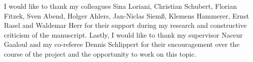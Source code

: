 %
%
I would like to thank my colleagues Sina Loriani, Christian Schubert, Florian Fitzek, Sven Abend, Holger Ahlers, Jan-Niclas Siem{\ss}, Klemens Hammerer, Ernst Rasel and Waldemar Herr for their support during my research and constructive criticism of the manuscript. Lastly, I would like to thank my supervisor Naceur Gaaloul and my co-referee Dennis Schlippert for their encouragement over the course of the project and the opportunity to work on this topic.
%